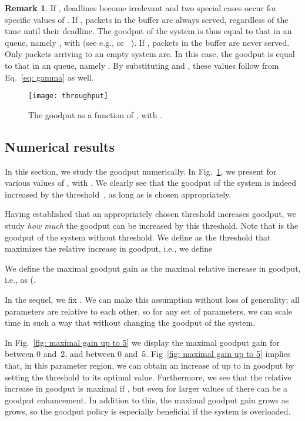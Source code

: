 \documentclass[preprint,12pt]{elsarticle}
\theoremstyle{definition}
\newtheorem{rem}{Remark}
\theoremstyle{plain}
\theoremstyle{remark}
\begin{document}
\begin{rem}
If , deadlines become irrelevant and two special cases occur for specific values of . If , packets in the buffer are always served, regardless of the time until their deadline. The goodput of the system is thus equal to that in an  queue, namely , with  (see e.g., \cite[Section~5.7]{wolff_intro_to_queueing_theory} or~ \cite[Section~3.6]{Kleinrock_queueing_systems_vol1}). If , packets in the buffer are never served. Only packets arriving to an empty system are. In this case, the goodput is equal to that in an  queue, namely . By substituting  and , these values follow from Eq.~\eqref{eq: gamma} as well.
\end{rem}

\begin{figure}[t]
\centering
\texttt{[image: throughput]}
\caption{The goodput as a function of , with .}
\label{fig: throughput mu=lambda=d=1}
\end{figure}

\subsection{Numerical results} \label{section:numerical-results-threshold}

In this section, we study the goodput numerically. In Fig.~\ref{fig: throughput mu=lambda=d=1}, we present  for various values of , with . We clearly see that the goodput of the system is indeed increased by the threshold~, as long as  is chosen appropriately.

Having established that an appropriately chosen threshold increases goodput, we study \emph{how much} the goodput can be increased by this threshold. Note that  is the goodput of the system without threshold. We define  as the threshold that maximizes the relative increase in goodput, i.e., we define

We define the maximal goodput gain as the maximal relative increase in goodput, i.e., as (.

In the sequel, we fix . We can make this assumption without loss of generality; all parameters are relative to each other, so for any set of parameters, we can scale time in such a way that  without changing the goodput of the system.

In Fig.~\ref{fig: maximal gain up to 5} we display the maximal goodput gain for  between 0 and~2, and  between 0 and~5. Fig~\ref{fig: maximal gain up to 5} implies that, in this parameter region, we can obtain an increase of up to  in goodput by setting the threshold to its optimal value. Furthermore, we see that the relative increase in goodput is maximal if , but even for larger values of  there can be a goodput enhancement. In addition to this, the maximal goodput gain grows as  grows, so the goodput policy is especially beneficial if the system is overloaded.
\end{document}
